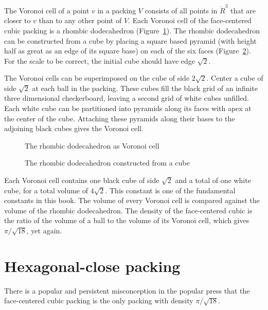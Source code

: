 The Voronoi cell of a point $v$ in a packing $V$ consists of all
points in $\ring{R}^3$ that are closer to $v$ than to any other point
of $V$.  Each Voronoi cell of the face-centered cubic packing is a
rhombic dodecahedron (Figure~\ref{fig:rhombic}).  %
The rhombic dodecahedron can be constructed from a cube by placing a
square based pyramid (with height half as great as an edge of its
square base) on each of the six faces
(Figure~\ref{fig:rhombic-cube}).  %
For the scale to be correct, the initial cube should have edge
$\sqrt{2}$.

The Voronoi cells can be superimposed on the cube of side $2\sqrt2$.
Center a cube of side $\sqrt2$ at each ball in the packing. These
cubes fill the black grid of an infinite three dimensional
checkerboard, leaving a second grid of white cubes unfilled.  Each
white cube can be partitioned into pyramids along its faces with apex
at the center of the cube.  Attaching these pyramids along their bases
to the adjoining black cubes gives the Voronoi cell.

\begin{figure}[htb]
  \centering
  \caption{The rhombic dodecahedron as Voronoi cell}
  \label{fig:rhombic}
\end{figure}

\begin{figure}[htb]
  \centering
  \caption{The rhombic dodecahedron constructed from a cube}
  \label{fig:rhombic-cube}
\end{figure}

Each Voronoi cell contains one black cube of side $\sqrt2$ and a total
of one white cube, for a total volume of $4\sqrt2$.  This constant is
one of the fundamental constants in this book.  The volume of every
Voronoi cell is compared against the volume of the rhombic
dodecahedron.  The density of the face-centered cubic is the ratio of
the volume of a ball to the volume of its Voronoi cell, which gives
$\pi/\sqrt{18}$, yet again.





\section{Hexagonal-close packing}

There is a popular and persistent misconception in the popular press
that the face-centered cubic packing is the only packing with density
$\pi/\sqrt{18}$.

